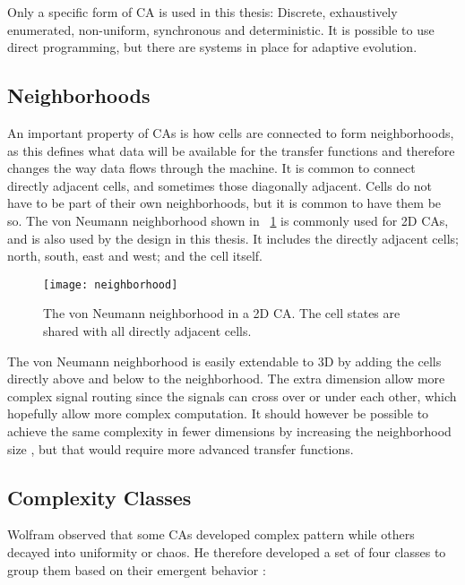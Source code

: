 Only a specific form of CA is used in this thesis:
Discrete, exhaustively enumerated, non-uniform, synchronous and deterministic.
It is possible to use direct programming, but there are systems in place for adaptive evolution.

\subsection{Neighborhoods}

An important property of CAs is how cells are connected to form neighborhoods, as this defines what data will be available for the transfer functions and therefore changes the way data flows through the machine.
It is common to connect directly adjacent cells, and sometimes those diagonally adjacent.
Cells do not have to be part of their own neighborhoods, but it is common to have them be so.
The von Neumann neighborhood shown in \figurename~\ref{fig:neighborhood} is commonly used for 2D CAs, and is also used by the design in this thesis.
It includes the directly adjacent cells; north, south, east and west; and the cell itself.

\begin{figure}[!ht]
    \centering
    \texttt{[image: neighborhood]}
    \caption[von Neumann Neighborhood]{
        The von Neumann neighborhood in a 2D CA.
        The cell states are shared with all directly adjacent cells.
    }
    \label{fig:neighborhood}
\end{figure}

The von Neumann neighborhood is easily extendable to 3D by adding the cells directly above and below to the neighborhood.
The extra dimension allow more complex signal routing since the signals can cross over or under each other, which hopefully allow more complex computation.
It should however be possible to achieve the same complexity in fewer dimensions by increasing the neighborhood size \CN, but that would require more advanced transfer functions.

\subsection{Complexity Classes}

Wolfram observed that some CAs developed complex pattern while others decayed into uniformity or chaos.
He therefore developed a set of four classes to group them based on their emergent behavior \cite{wolfram1984complexity}:

